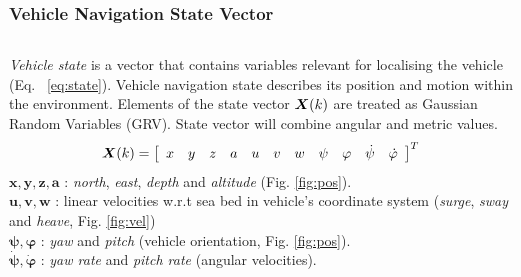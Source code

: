 \begin{frame}\frametitle{Vehicle Navigation State Vector}
\begin{columns}
	\textit{Vehicle state} is a vector that contains variables relevant for localising the vehicle (Eq. ~\ref{eq:state}). Vehicle navigation state describes its position and motion within the environment. Elements of the state vector $\boldsymbol{X}(k)$ are treated as Gaussian Random Variables (GRV). State vector will combine angular and metric values. \\
	{\footnotesize
	\begin{align}
		\boldsymbol{X}(k) = \left[ 
		\begin{array}{ccccccccccc}
		x & y & z & a & u & v & w & \psi & \varphi & \dot{\psi} & \dot{\varphi}
		\end{array} \right] ^{T}
		\label{eq:state}
	\end{align}
	}
{\footnotesize	
$\boldsymbol{x, y, z, a}$ : \textit{north}, \textit{east}, \textit{depth} and \textit{altitude} (Fig. \ref{fig:pos}). \\ 
$\boldsymbol{u, v, w}$ : linear velocities w.r.t sea bed in vehicle's coordinate system (\textit{surge}, \textit{sway} and \textit{heave}, Fig. \ref{fig:vel}) \\
$\boldsymbol{\psi, \varphi}$ : \textit{yaw} and \textit{pitch} (vehicle orientation, Fig. \ref{fig:pos}). \\
$\boldsymbol{\dot{\psi}, \dot{\varphi}}$ : \textit{yaw rate} and \textit{pitch rate} (angular velocities). 
} 
		

\end{columns}
\end{frame}
